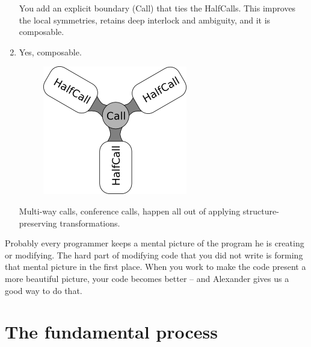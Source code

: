 \begin{enumerate}
\begin{figure}[h!]
   \end{figure}
 You add an explicit boundary (Call) that ties the HalfCalls. This improves the
local symmetries, retains deep interlock and ambiguity, and it is composable.
 \item Yes, composable.
   \begin{figure}[h!]
     \centering
     \includegraphics[scale=0.6,keepaspectratio=true]{./usability/federico5.png}
   \end{figure}
 Multi-way calls, conference calls, happen all out of applying
structure-preserving transformations.
\end{enumerate}
Probably every programmer keeps a mental picture of the program he is creating
or modifying. The hard part of modifying code that you did not write is forming
that mental picture in the first place. When you work to make the code present a
more beautiful picture, your code becomes better -- and Alexander gives us a good
way to do that.

\section*{The fundamental process}

